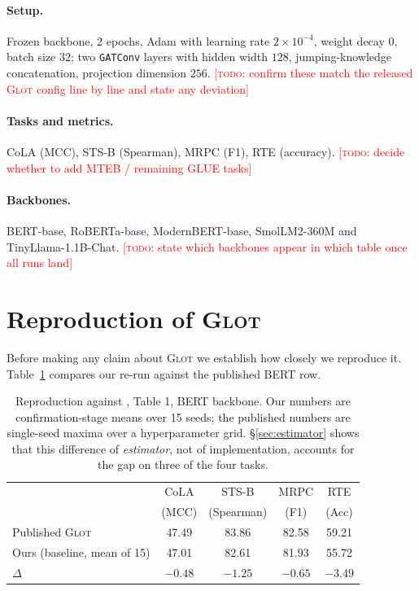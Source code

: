 \documentclass{article} %
\newcommand{\TODO}[1]{\textcolor{red}{[\textsc{todo}: #1]}}
\begin{document}
\paragraph{Setup.} Frozen backbone, 2 epochs, Adam with learning rate
$2\times10^{-4}$, weight decay $0$, batch size $32$; two \texttt{GATConv}
layers with hidden width $128$, jumping-knowledge concatenation, projection
dimension $256$. \TODO{confirm these match the released \textsc{Glot} config
line by line and state any deviation}

\paragraph{Tasks and metrics.} CoLA (MCC), STS-B (Spearman), MRPC (F1),
RTE (accuracy). \TODO{decide whether to add MTEB / remaining GLUE tasks}

\paragraph{Backbones.} BERT-base, RoBERTa-base, ModernBERT-base,
SmolLM2-360M and TinyLlama-1.1B-Chat.
\TODO{state which backbones appear in which table once all runs land}

\section{Reproduction of \textsc{Glot}}
\label{sec:repro}

Before making any claim about \textsc{Glot} we establish how closely we
reproduce it. Table~\ref{tab:repro} compares our re-run against the published
BERT row.

\begin{table}[t]
\caption{Reproduction against \citet{mantri2026glot}, Table 1, BERT backbone.
Our numbers are confirmation-stage means over 15 seeds; the published numbers
are single-seed maxima over a hyperparameter grid. \S\ref{sec:estimator} shows
that this difference of \emph{estimator}, not of implementation, accounts for
the gap on three of the four tasks.}
\label{tab:repro}
\begin{center}
\begin{tabular}{lcccc}
\toprule
 & CoLA & STS-B & MRPC & RTE \\
 & (MCC) & (Spearman) & (F1) & (Acc) \\
\midrule
Published \textsc{Glot}      & 47.49 & 83.86 & 82.58 & 59.21 \\
Ours (baseline, mean of 15)  & 47.01 & 82.61 & 81.93 & 55.72 \\
\midrule
$\Delta$                     & $-0.48$ & $-1.25$ & $-0.65$ & $-3.49$ \\
\bottomrule
\end{tabular}
\end{center}
\end{table}
\end{document}
